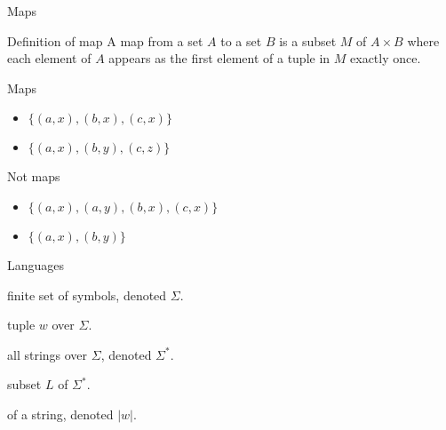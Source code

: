 \documentclass{beamer}
\begin{document}
  
  \begin{frame}{Maps}
  
    \begin{alertblock}{Definition of map}
      A map from a set $A$ to a set $B$ is a subset $M$ of $A \times B$ where each element of $A$ appears as the first element of a tuple in $M$ exactly once.
    \end{alertblock}
  
  
    \begin{minipage}[t]{0.48\linewidth}
    \begin{exampleblock}{Maps}
      \begin{itemize}
        \item $\{(a,x),(b,x),(c,x)\}$
        \item $\{(a,x),(b,y),(c,z)\}$
      \end{itemize}
    \end{exampleblock}
  \end{minipage}
  \begin{minipage}[t]{0.48\linewidth}
    \begin{exampleblock}{Not maps}
      \begin{itemize}
        \item $\{(a,x),(a,y),(b,x),(c,x)\}$
        \item $\{(a,x),(b,y)\}$
      \end{itemize}
    \end{exampleblock}
  \end{minipage}
  \end{frame}
  
  
  
  \begin{frame}{Languages}
    \begin{description}
      \setlength\itemsep{6mm}
      \item[Alphabet:] finite set of symbols, denoted \( \Sigma \).
      \item[String:] tuple \( w \) over \( \Sigma \).
      \item[Star:] all strings over \( \Sigma \), denoted \( \Sigma^* \).
      \item[Language:] subset \( L \) of \( \Sigma^* \).
      \item[Length:] of a string, denoted \( |w| \).
    \end{description}
  \end{frame}
  
\end{document}
